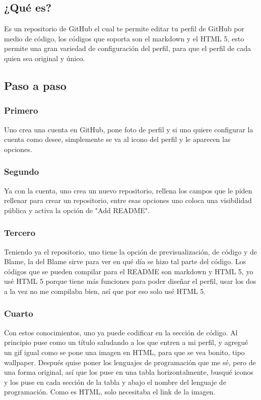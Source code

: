 \documentclass[conference]{IEEEtran}
\begin{document}
\subsection{¿Qué es?}
Es un repositorio de GitHub el cual te permite editar tu perfil de GitHub por medio de código, los códigos que soporta son el markdown y el HTML 5, esto permite una gran variedad de configuración del perfil, para que el perfil de cada quien sea original y único.

\subsection{Paso a paso}

\subsubsection{Primero}
Uno crea una cuenta en GitHub, pone foto de perfil y si uno quiere configurar la cuenta como desee, simplemente se va al icono del perfil y le aparecen las opciones.

\subsubsection{Segundo}
Ya con la cuenta, uno crea un nuevo repositorio, rellena los campos que le piden rellenar para crear un repositorio, entre esas opciones uno coloca una visibilidad pública y activa la opción de "Add README".

\subsubsection{Tercero}
Teniendo ya el repositorio, uno tiene la opción de previsualización, de código y de Blame, la del Blame sirve para ver en qué día se hizo tal parte del código. Los códigos que se pueden compilar para el README son markdown y HTML 5, yo usé HTML 5 porque tiene más funciones para poder diseñar el perfil, usar los dos a la vez no me compilaba bien, así que por eso solo usé HTML 5.

\subsubsection{Cuarto}
Con estos conocimientos, uno ya puede codificar en la sección de código. Al principio puse como un título saludando a los que entren a mi perfil, y agregué un gif igual como se pone una imagen en HTML, para que se vea bonito, tipo wallpaper. Después quise poner los lenguajes de programación que me sé, pero de una forma original, así que los puse en una tabla horizontalmente, busqué iconos y los puse en cada sección de la tabla y abajo el nombre del lenguaje de programación. Como es HTML, solo necesitaba el link de la imagen.
\end{document}
